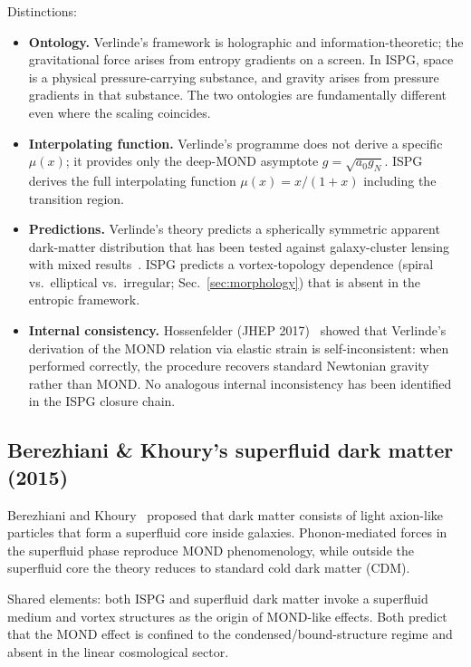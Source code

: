 \documentclass[11pt]{article}
\begin{document}
Distinctions:
\begin{itemize}
  \item \textbf{Ontology.}  Verlinde's framework is holographic and
    information-theoretic; the gravitational force arises from
    entropy gradients on a screen.  In ISPG, space is a physical
    pressure-carrying substance, and gravity arises from pressure
    gradients in that substance.  The two ontologies are
    fundamentally different even where the scaling coincides.
  \item \textbf{Interpolating function.}  Verlinde's programme does
    not derive a specific $\mu(x)$; it provides only the deep-MOND
    asymptote $g=\sqrt{a_0 g_N}$.  ISPG derives the full
    interpolating function $\mu(x)=x/(1+x)$ including the
    transition region.
  \item \textbf{Predictions.}  Verlinde's theory predicts a
    spherically symmetric apparent dark-matter distribution that has
    been tested against galaxy-cluster lensing with mixed
    results~\cite{Brouwer2017}.  ISPG predicts a vortex-topology
    dependence (spiral vs.\ elliptical vs.\ irregular;
    Sec.~\ref{sec:morphology}) that is absent in the entropic
    framework.
  \item \textbf{Internal consistency.}  Hossenfelder (JHEP
    2017)~\cite{Hossenfelder2017} showed that Verlinde's derivation
    of the MOND relation via elastic strain is self-inconsistent:
    when performed correctly, the procedure recovers standard
    Newtonian gravity rather than MOND.  No analogous internal
    inconsistency has been identified in the ISPG closure chain.
\end{itemize}

\subsection{Berezhiani \& Khoury's superfluid dark matter (2015)}

Berezhiani and Khoury~\cite{Berezhiani2015} proposed that dark
matter consists of light axion-like particles that form a superfluid
core inside galaxies.  Phonon-mediated forces in the superfluid
phase reproduce MOND phenomenology, while outside the superfluid
core the theory reduces to standard cold dark matter (CDM).

Shared elements: both ISPG and superfluid dark matter invoke a
superfluid medium and vortex structures as the origin of MOND-like
effects.  Both predict that the MOND effect is confined to the
condensed/bound-structure regime and absent in the linear
cosmological sector.
\end{document}
